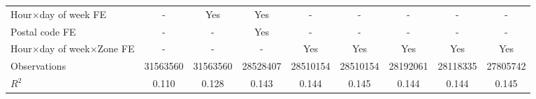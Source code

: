 {\begin{tabular}{l*{8}{S}}
\addlinespace
Hour\(\times\)day of week FE&         {-}         &       {Yes}         &       {Yes}         &         {-}         &         {-}         &         {-}         &         {-}         &         {-}         \\
\addlinespace
Postal code FE      &         {-}         &         {-}         &       {Yes}         &         {-}         &         {-}         &         {-}         &         {-}         &         {-}         \\
\addlinespace
Hour\(\times\)day of week\(\times\)Zone FE&         {-}         &         {-}         &         {-}         &       {Yes}         &       {Yes}         &       {Yes}         &       {Yes}         &       {Yes}         \\
\midrule
Observations        &\num{31563560}         &\num{31563560}         &\num{28528407}         &\num{28510154}         &\num{28510154}         &\num{28192061}         &\num{28118335}         &\num{27805742}         \\
$R^2$             &     {0.110}         &     {0.128}         &     {0.143}         &     {0.144}         &     {0.145}         &     {0.144}         &     {0.144}         &     {0.145}         \\
\bottomrule
\end{tabular}
}

